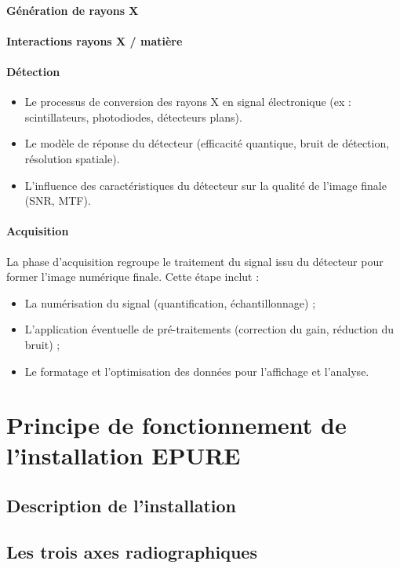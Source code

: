 \documentclass[12pt,a4paper]{report}
\begin{document}
\paragraph{Génération de rayons X}
\paragraph{Interactions rayons X / matière}
\paragraph{Détection}
\begin{itemize}
    \item Le processus de conversion des rayons X en signal électronique (ex : scintillateurs, photodiodes, détecteurs plans).
    \item Le modèle de réponse du détecteur (efficacité quantique, bruit de détection, résolution spatiale).
    \item L'influence des caractéristiques du détecteur sur la qualité de l'image finale (SNR, MTF).
\end{itemize}
\paragraph{Acquisition}
La phase d'acquisition regroupe le traitement du signal issu du détecteur pour former l'image numérique finale. Cette étape inclut :
\begin{itemize}
    \item La numérisation du signal (quantification, échantillonnage) ;
    \item L'application éventuelle de pré-traitements (correction du gain, réduction du bruit) ;
    \item Le formatage et l'optimisation des données pour l'affichage et l'analyse.
\end{itemize}

\section{Principe de fonctionnement de l'installation EPURE}
\subsection{Description de l'installation}
\subsection{Les trois axes radiographiques}
\end{document}
